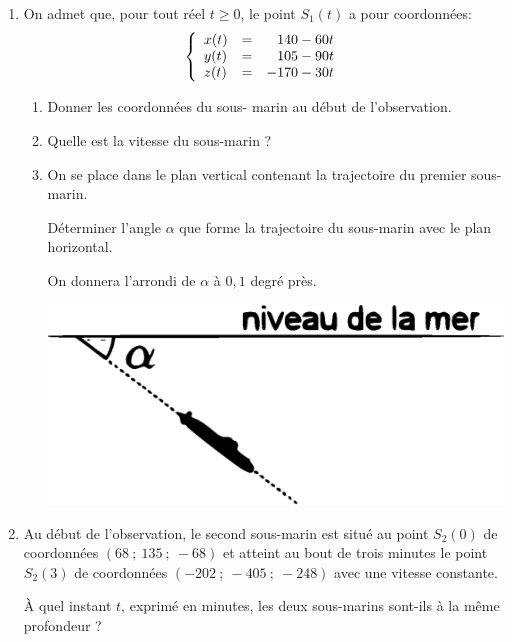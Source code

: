 \documentclass[10pt,a4paper]{article}
\begin{document}
\begin{enumerate}
\item On admet que, pour tout réel $t \geqslant 0$, le point $S_1(t)$ a pour coordonnées:
\[\left\{\begin{array}{l c l}
x(t) &=& \phantom{-}140 - 60t\\
y(t) &=& \phantom{-}105 - 90t\\
z(t) &=& -170 - 30 t
\end{array}\right.\]

	\begin{enumerate}
		\item Donner les coordonnées du sous- marin au début de l'observation.
		\item Quelle est la vitesse du sous-marin ?
\item  On se place dans le plan vertical contenant la trajectoire du premier sous-marin.
		
\parbox{0.7\linewidth}{Déterminer l'angle $\alpha$ que forme la trajectoire du sous-marin avec le plan horizontal.
		
On donnera l'arrondi de $\alpha$ à $0,1$ degré près.}\hfill
\parbox{0.28\linewidth}{		
\begin{flushright}
\includegraphics[scale=0.22]{Exo3_2}
\end{flushright}}

	\end{enumerate}
\item  Au début de l'observation, le second sous-marin est situé au point $S_2(0)$ de coordonnées
$(68~;~135~;~- 68)$ et atteint au bout de trois minutes le point $S_2(3)$ de coordonnées $(-202~;~-405~;~ - 248)$ avec une vitesse constante.

À quel instant $t$, exprimé en minutes, les deux sous-marins sont-ils à la même profondeur ?
\end{enumerate}

\vspace{0,5cm}
\end{document}
